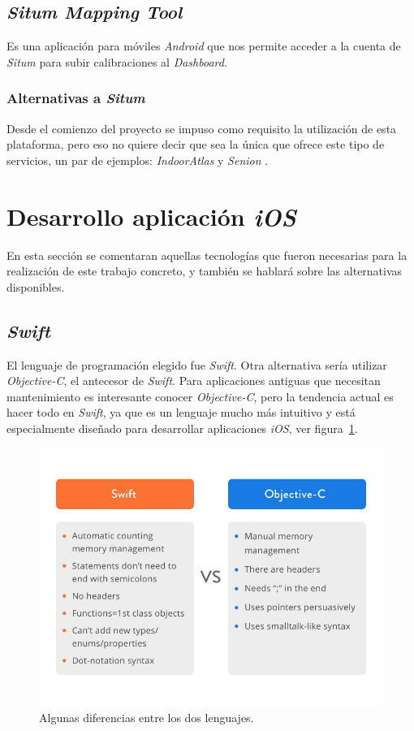 \subsection{\textit{Situm Mapping Tool}}
Es una aplicación para móviles \textit{Android} que nos permite acceder a la cuenta de \textit{Situm} para subir calibraciones al \textit{Dashboard}.

\subsubsection{Alternativas a \textit{Situm}}
Desde el comienzo del proyecto se impuso como requisito la utilización de esta plataforma, pero eso no quiere decir que sea la única que ofrece este tipo de servicios, un par de ejemplos:  \textit{IndoorAtlas} \cite{noauthor_indooratlas_nodate} y \textit{Senion} \cite{noauthor_senion_nodate}.


\section{Desarrollo aplicación \textit{iOS}}
En esta sección se comentaran aquellas tecnologías que fueron necesarias para la realización de este trabajo concreto, y también se hablará sobre las alternativas disponibles.

\subsection{\textit{Swift}}
El lenguaje de programación elegido fue \textit{Swift}. Otra alternativa sería utilizar \textit{Objective-C}, el antecesor de \textit{Swift}. Para aplicaciones antiguas que necesitan mantenimiento es interesante conocer \textit{Objective-C}, pero la tendencia actual es hacer todo en \textit{Swift}, ya que es un lenguaje mucho más intuitivo y está especialmente diseñado para desarrollar aplicaciones \textit{iOS}, ver figura~\ref{fig:objc_swift}.

\begin{figure}[tbp]
\centering
\includegraphics[scale=0.45]{figures/objc_swift.jpg}
\caption{Algunas diferencias entre los dos lenguajes.\label{fig:objc_swift}}
\end{figure}

